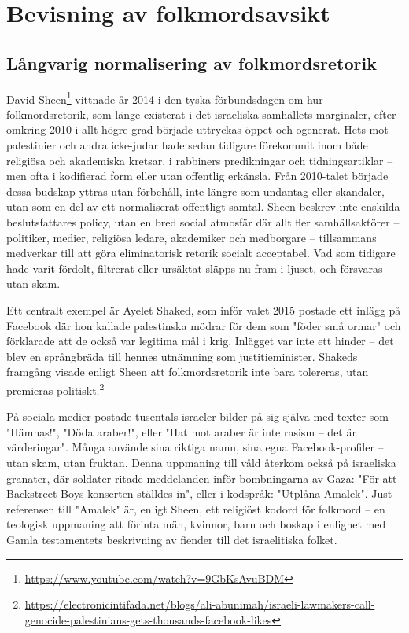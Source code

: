 
\newpage

\section{Bevisning av folkmordsavsikt}
\subsection{Långvarig normalisering av folkmordsretorik}

David Sheen\footnote{\url{https://www.youtube.com/watch?v=9GbKsAvuBDM}} vittnade år 2014 i 
den tyska förbundsdagen om hur folkmordsretorik, som länge existerat
i det israeliska samhällets marginaler, efter omkring 2010 i allt högre grad började uttryckas öppet och
ogenerat. Hets mot palestinier och andra icke-judar hade sedan tidigare förekommit inom både religiösa
och akademiska kretsar, i rabbiners predikningar och tidningsartiklar – men ofta i kodifierad form eller
utan offentlig erkänsla. Från 2010-talet började dessa budskap yttras utan förbehåll, inte längre som
undantag eller skandaler, utan som en del av ett normaliserat offentligt samtal. Sheen beskrev inte enskilda
beslutsfattares policy, utan en bred social atmosfär där allt fler samhällsaktörer – politiker, medier,
religiösa ledare, akademiker och medborgare – tillsammans medverkar till att göra eliminatorisk retorik
socialt acceptabel. Vad som tidigare hade varit fördolt, filtrerat eller ursäktat släpps nu fram i ljuset, och
försvaras utan skam.


Ett centralt exempel är Ayelet Shaked, som inför valet 2015 postade ett inlägg på Facebook där hon kallade
palestinska mödrar för dem som "föder små ormar" och förklarade att de också var legitima mål i krig. Inlägget
var inte ett hinder – det blev en språngbräda till hennes utnämning som justitieminister. Shakeds
framgång visade enligt Sheen att folkmordsretorik inte bara tolereras, utan premieras politiskt.\footnote{\url{https://electronicintifada.net/blogs/ali-abunimah/israeli-lawmakers-call-genocide-palestinians-gets-thousands-facebook-likes}}

På sociala medier postade tusentals israeler bilder på sig själva med texter som "Hämnas!", "Döda araber!",
eller "Hat mot araber är inte rasism – det är värderingar". Många använde sina riktiga namn, sina egna
Facebook-profiler – utan skam, utan fruktan. Denna uppmaning till våld återkom också på israeliska granater,
där soldater ritade meddelanden inför bombningarna av Gaza: "För att Backstreet Boys-konserten ställdes in",
eller i kodspråk: "Utplåna Amalek". Just referensen till "Amalek" är, enligt Sheen, ett religiöst kodord för
folkmord – en teologisk uppmaning att förinta män, kvinnor, barn och boskap i enlighet med Gamla testamentets
beskrivning av fiender till det israelitiska folket.


